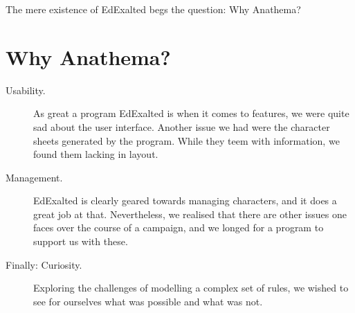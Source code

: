 The mere existence of EdExalted begs the question: Why Anathema?

\section{Why Anathema?}
\begin{description}
\item[Usability.]As great a program EdExalted is when it comes to features, we were quite sad about the user interface. 
Another issue we had were the character sheets generated by the program. While they teem with information, we found them lacking in layout.

\item[Management.]EdExalted is clearly geared towards managing characters, and it does a great job at that. Nevertheless, we realised that there are other issues one faces over the course of a campaign, and we longed for a program to support us with these.

\item[Finally: Curiosity.] Exploring the challenges of modelling a complex set of rules, we wished to see for ourselves what was possible and what was not.
\end{description}